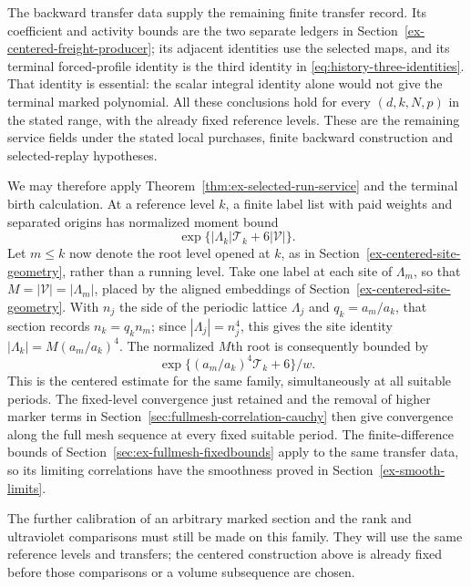 The backward transfer data supply the remaining finite transfer
record. Its coefficient and activity bounds are the two separate
ledgers in Section~\ref{ex-centered-freight-producer}; its adjacent
identities use the selected maps, and its terminal forced-profile
identity is the third identity in
\eqref{eq:history-three-identities}. That identity is essential:
the scalar integral identity alone would not give the terminal
marked polynomial. All these conclusions hold for every $(d,k,N,p)$
in the stated range, with the already fixed reference levels.
These are the remaining service fields under the stated local purchases,
finite backward construction and selected-replay hypotheses.

We may therefore apply Theorem~\ref{thm:ex-selected-run-service}
and the terminal birth calculation. At a reference level $k$, a
finite label list with paid weights and separated origins has
normalized moment bound
\[
              \exp\{|\Lambda_k|\mathcal T_k+6|\mathcal V|\}.
\]
Let $m\le k$ now denote the root level opened at $k$, as in
Section~\ref{ex-centered-site-geometry}, rather than a running level.
Take one label at each site of $\Lambda_m$, so that
$M=|\mathcal V|=|\Lambda_m|$, placed by the aligned embeddings of
Section~\ref{ex-centered-site-geometry}. With $n_j$ the side of the
periodic lattice $\Lambda_j$ and $q_k=a_m/a_k$, that section records
$n_k=q_kn_m$; since $|\Lambda_j|=n_j^4$, this gives the site identity
$|\Lambda_k|=M(a_m/a_k)^4$.
The normalized $M$th root is consequently bounded by
\[
              \exp\{(a_m/a_k)^4\mathcal T_k+6\}/w.
\]
This is the centered estimate for the same family, simultaneously
at all suitable periods. The fixed-level convergence just retained
and the removal of higher marker terms in
Section~\ref{sec:fullmesh-correlation-cauchy} then give convergence
along the full mesh sequence at every fixed suitable period.
The finite-difference bounds of
Section~\ref{sec:ex-fullmesh-fixedbounds} apply to the same
transfer data, so its limiting correlations have the smoothness
proved in Section~\ref{ex-smooth-limits}.

The further calibration of an arbitrary marked section and the
rank and ultraviolet comparisons must still be made on this family.
They will use the same reference levels and transfers; the centered
construction above is already fixed before those comparisons or a
volume subsequence are chosen.


